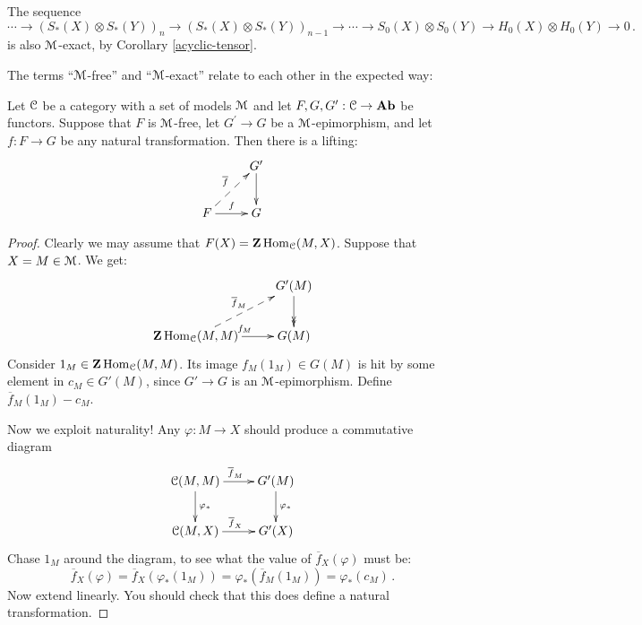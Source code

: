 \begin{example}
The sequence
\[
\cdots\to(S_\ast(X)\otimes S_\ast(Y))_n\to(S_\ast(X)\otimes S_\ast(Y))_{n-1}\to
\cdots\to S_0(X)\otimes S_0(Y)\to H_0(X)\otimes H_0(Y)\to 0\,.
\]
is also $\mathcal M$-exact, by Corollary \ref{acyclic-tensor}.
\end{example}
The terms ``$\mathcal M$-free'' and ``$\mathcal M$-exact'' relate to each other in the 
expected way:
\begin{lemma}
Let $\mathcal C$ be a category with a set of models $\mathcal M$ and let $F,G,G^\prime:\mathcal C\to\mathbf{Ab}$ be functors. Suppose that $F$ is $\mathcal M$-free, let $G^\prime\to G$ be a $\mathcal M$-epimorphism, and let $f:F\to G$ be any natural transformation.  
Then there is a lifting:
\begin{equation*}
\xymatrix{ & G^\prime\ar[d]\\
F\ar@{-->}[ur]^{\overline{f}}\ar[r]^f & G}
\end{equation*}
\end{lemma}
\begin{proof}
Clearly we may assume that $F(X)=\mathbf Z\operatorname{Hom}_\mathcal C(M,X)$. Suppose that $X=M\in\mathcal M$. 
We get:
\begin{equation*}
\xymatrix{ & G^\prime(M)\ar@{->>}[d]\\
\Z\Hom_\cc(M,M)\ar@{-->}[ur]^{\overline{f}_M}\ar[r]^{f_M} & G(M)}
\end{equation*}
Consider $1_M\in\mathbf Z\operatorname{Hom}_\mathcal C(M,M)$. Its image  $f_M(1_M)\in G(M)$ is hit by
some element in $c_M\in G'(M)$, since $G'\to G$ is an $\mathcal M$-epimorphism. Define
$\overline f_M(1_M)-c_M$.

Now we exploit naturality! Any $\varphi:M\to X$ should produce a commutative 
diagram
\begin{equation*}
\xymatrix{\cc(M,M)\ar[r]^{\overline{f}_M} \ar[d]^{\varphi_*}
& G^\prime(M)\ar[d]^{\varphi_*} \\
\cc(M,X)\ar[r]^{\overline{f}_X} & G^\prime(X)}
\end{equation*}
Chase $1_M$ around the diagram, to see what the value of 
$\overline{f}_X(\varphi)$ must be:
\[
\overline{f}_X(\varphi)=\overline{f}_X(\varphi_*(1_M))=
\varphi_*(\overline{f}_M(1_M))=\varphi_*(c_M)\,.
\]
Now extend linearly. You should check that this does define a natural
transformation. 
\end{proof}

